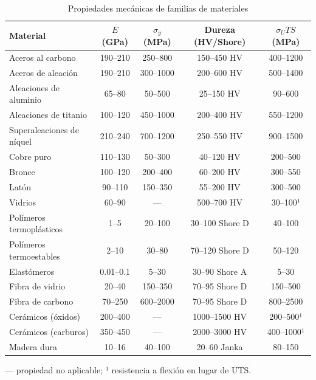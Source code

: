 \begin{table}[htbp]
  \centering
  \small
  \caption{Propiedades mecánicas de familias de materiales}
  \label{tab:prop_mat_mecanicas}
  \begin{tabular}{@{} l c c c c @{}}
    \toprule
    Material                  & $E$ (GPa) & $\sigma_y$ (MPa) & Dureza (HV/Shore) & $\sigma_UTS$ (MPa)\tnote{1} \\
    \midrule
    Aceros al carbono         & 190–210   & 250–800          & 150–450 HV        & 400–1200          \\
    Aceros de aleación        & 190–210   & 300–1000         & 200–600 HV        & 500–1400          \\
    Aleaciones de aluminio    & 65–80     & 50–500           & 25–150 HV         & 90–600            \\
    Aleaciones de titanio     & 100–120   & 450–1000         & 200–400 HV        & 550–1200          \\
    Superaleaciones de níquel & 210–240   & 700–1200         & 250–550 HV        & 900–1500          \\
    Cobre puro                & 110–130   & 50–300           & 40–120 HV         & 200–500           \\
    Bronce                    & 100–120   & 200–400          & 60–200 HV         & 300–550           \\
    Latón                     & 90–110    & 150–350          & 55–200 HV         & 300–500           \\
    Vidrios                   & 60–90     & —                & 500–700 HV        & 30–100¹           \\
    Polímeros termoplásticos  & 1–5       & 20–100           & 30–100 Shore D    & 40–100            \\
    Polímeros termoestables   & 2–10      & 30–80            & 70–120 Shore D    & 50–120            \\
    Elastómeros               & 0.01–0.1  & 5–30             & 30–90 Shore A     & 5–30              \\
    Fibra de vidrio           & 20–40     & 150–350          & 70–95 Shore D     & 150–500           \\
    Fibra de carbono          & 70–250    & 600–2000         & 70–95 Shore D     & 800–2500          \\
    Cerámicos (óxidos)        & 200–400   & —                & 1000–1500 HV      & 200–500¹          \\
    Cerámicos (carburos)      & 350–450   & —                & 2000–3000 HV      & 400–1000¹         \\
    Madera dura               & 10–16     & 40–100           & 20–60 Janka       & 80–150            \\
    \bottomrule
  \end{tabular}

  \vspace{1mm}
  \footnotesize
  — propiedad no aplicable; ¹ resistencia a flexión en lugar de UTS.
\end{table}


